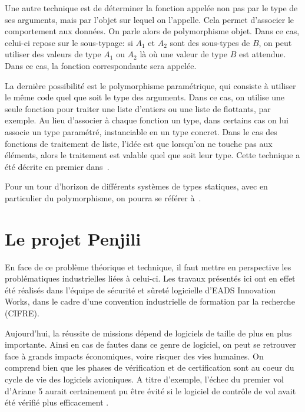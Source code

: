 Une autre technique est de déterminer la fonction appelée non pas par le type de
ses arguments, mais par l'objet sur lequel on l'appelle. Cela permet d'associer
le comportement aux données. On parle alors de polymorphisme objet. Dans ce cas,
celui-ci repose sur le sous-typage: si $A_1$ et $A_2$ sont des sous-types de
$B$, on peut utiliser des valeurs de type $A_1$ ou $A_2$ là où une valeur de
type $B$ est attendue. Dans ce cas, la fonction correspondante sera appelée.

La dernière possibilité est le polymorphisme paramétrique, qui consiste à
utiliser le \linebreak même code quel que soit le type des arguments. Dans ce
cas, on utilise une seule fonction pour traiter une liste d'entiers ou une liste
de flottants, par exemple. Au lieu d'associer à chaque fonction un type, dans
certains cas on lui associe un type paramétré, instanciable en un type concret.
Dans le cas des fonctions de traitement de liste, l'idée est que lorsqu'on ne
touche pas aux éléments, alors le traitement est valable quel que soit leur
type. Cette technique a été décrite en premier dans~\cite{Milner78}.

Pour un tour d'horizon de différents systèmes de types statiques, avec en
particulier du polymorphisme, on pourra se référer à~\cite{TAPL}.

\section{Le projet Penjili}

En face de ce problème théorique et technique, il faut mettre en perspective les
problématiques industrielles liées à celui-ci. Les travaux présentés ici ont en
effet été réalisés dans l'équipe de sécurité et sûreté logicielle d'EADS
Innovation Works, dans le cadre d'une convention industrielle de formation par
la recherche (CIFRE).

Aujourd'hui, la réussite de missions dépend de logiciels de taille de plus en
plus importante. Ainsi en cas de fautes dans ce genre de logiciel, on peut se
retrouver face à grands impacts économiques, voire risquer des vies humaines. On
comprend bien que les phases de vérification et de certification sont au coeur
du cycle de vie des logiciels avioniques. A titre d'exemple, l'échec du premier
vol d'Ariane 5 aurait certainement pu être évité si le logiciel de contrôle de
vol avait été vérifié plus efficacement \cite{Ariane501}.

